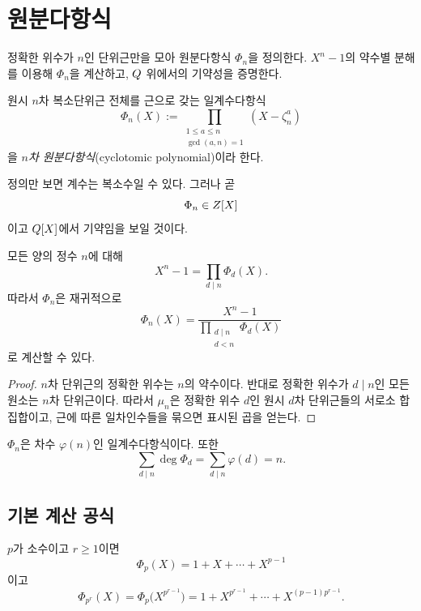 \clearpage
\section{원분다항식}
\label{sec:cyclotomic-polynomials}

\begin{learninggoal}
정확한 위수가 $n$인 단위근만을 모아 원분다항식 $\Phi_n$을 정의한다. $X^n-1$의 약수별 분해를 이용해 $\Phi_n$을 계산하고, $Q$ 위에서의 기약성을 증명한다.
\end{learninggoal}

\begin{definition}[원분다항식]
원시 $n$차 복소단위근 전체를 근으로 갖는 일계수다항식
\[
  \Phi_n(X)
  :=\prod_{\substack{1\le a\le n\\\gcd(a,n)=1}}
  (X-\zeta_n^a)
\]
을 \emph{$n$차 원분다항식}(cyclotomic polynomial)이라 한다.
\end{definition}

정의만 보면 계수는 복소수일 수 있다. 그러나 곧
\[
  \Phi_n\in Z[X]
\]
이고 $Q[X]$에서 기약임을 보일 것이다.

\begin{theorem}
\label{thm:cyclotomic-factorization}
모든 양의 정수 $n$에 대해
\[
  \boxed{X^n-1=\prod_{d\mid n}\Phi_d(X)}.
\]
따라서 $\Phi_n$은 재귀적으로
\[
  \Phi_n(X)
  =\frac{X^n-1}{\displaystyle\prod_{\substack{d\mid n\\d<n}}\Phi_d(X)}
\]
로 계산할 수 있다.
\end{theorem}

\begin{proof}
$n$차 단위근의 정확한 위수는 $n$의 약수이다. 반대로 정확한 위수가 $d\mid n$인 모든 원소는 $n$차 단위근이다. 따라서 $\mu_n$은 정확한 위수 $d$인 원시 $d$차 단위근들의 서로소 합집합이고, 근에 따른 일차인수들을 묶으면 표시된 곱을 얻는다.
\end{proof}

\begin{corollary}
\label{cor:cyclotomic-degree}
$\Phi_n$은 차수 $\varphi(n)$인 일계수다항식이다. 또한
\[
  \sum_{d\mid n}\deg\Phi_d
  =\sum_{d\mid n}\varphi(d)=n.
\]
\end{corollary}

\subsection{기본 계산 공식}

\begin{proposition}
\label{prop:cyclotomic-prime-power}
$p$가 소수이고 $r\ge1$이면
\[
  \Phi_p(X)=1+X+\cdots+X^{p-1}
\]
이고
\[
  \boxed{
  \Phi_{p^r}(X)
  =\Phi_p\bigl(X^{p^{r-1}}\bigr)
  =1+X^{p^{r-1}}+\cdots+X^{(p-1)p^{r-1}}.}
\]
\end{proposition}

